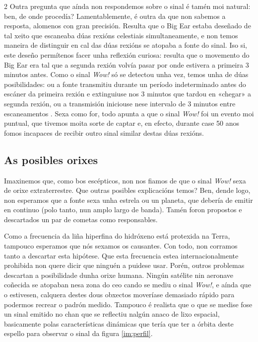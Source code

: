 \begin{multicols}{2}
Outra pregunta que aínda non respondemos sobre o sinal é tamén moi natural:
ben, de onde procedía? Lamentablemente, é outra da que non sabemos a resposta,
alomenos con gran precisión. Resulta que o Big Ear estaba deseñado de tal xeito %
que escaneaba dúas rexións celestiais simultaneamente, e non temos maneira de
distinguir en cal das dúas rexións se atopaba a fonte do sinal. Iso si, este
deseño permítenos facer unha reflexión curiosa: resulta que o movemento do Big
Ear era tal que a segunda rexión volvía pasar por onde estivera a primeira 3
minutos antes. Como o sinal \textit{Wow!} só se detectou unha vez, temos unha
de dúas posibilidades: ou a fonte transmitiu durante un período indeterminado
antes do escáner da primeira rexión e extinguiuse nos 3 minutos que tardou en
«chegar» a segunda rexión, ou a transmisión iniciouse nese intervalo de 3
minutos entre escaneamentos \cite{Lemmino}. Sexa como for, todo apunta a que o
sinal \textit{Wow!} foi un evento moi puntual, que tivemos moita sorte de
captar e, en efecto, durante case 50 anos fomos incapaces de recibir outro sinal
similar destas dúas rexións.

\subsection*{As posibles orixes}

Imaxinemos que, como bos escépticos, non nos fiamos de que o sinal
\textit{Wow!} sexa de orixe extraterrestre. Que outras posibles explicacións
temos? Ben, dende logo, non esperamos que a fonte sexa unha estrela ou un
planeta, que debería de emitir en continuo (polo tanto, nun amplo largo de
banda). Tamén foron propostos e descartados un par de cometas como
responsables.

Como a frecuencia da liña hiperfina do hidróxeno está protexida na Terra,
tampouco esperamos que nós sexamos os causantes. Con todo, non corramos tanto a
descartar esta hipótese. Que esta frecuencia estea internacionalmente prohibida
non quere dicir que ninguén a puidese usar. Porén, outros problemas descartan a
posibilidade dunha orixe humana. Ningún satélite nin aeronave coñecida se
atopaban nesa zona do ceo cando se mediu o sinal \textit{Wow!}, e aínda que o
estivesen, calquera destes dous obxectos moveríase demasiado rápido para
podermos recrear o padrón medido. Tampouco é realista que o que se medise fose
un sinal emitido no chan que se reflectiu nalgún anaco de lixo espacial,
basicamente polas características dinámicas que tería que ter a órbita deste
espello para observar o sinal da figura \ref{im:perfil}.


\end{multicols}
